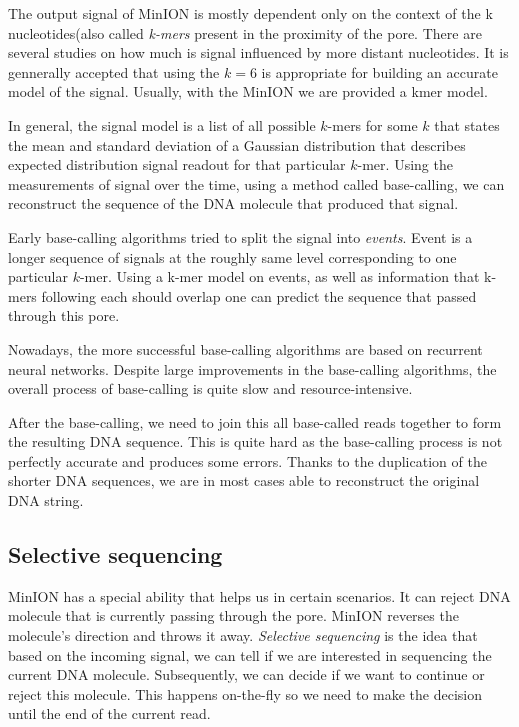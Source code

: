 The output signal of MinION is mostly dependent only on the context of the k
nucleotides(also called \textit{k-mers} present in the proximity of the pore. There are several studies on
how much is signal influenced by more distant nucleotides. It is gennerally accepted
that using the $k = 6$ is appropriate for building an accurate model of the signal. 
Usually, with the MinION we are provided a kmer model.

In general, the signal model is a list of all possible $k$-mers for some $k$
that states the mean and standard deviation of a Gaussian distribution that
describes expected distribution signal readout for that particular $k$-mer.
Using the measurements of signal over the time, using a method called base-calling, we can reconstruct the
sequence of the DNA molecule that produced that signal.

Early base-calling algorithms tried to split the signal into \textit{events}\cite{david2017nanocall}.
Event is a longer sequence of signals at the roughly same level corresponding
to one particular $k$-mer. Using a k-mer model on events, as well as information
that k-mers following each should overlap one can predict the sequence that passed through this pore.

Nowadays, the more successful base-calling algorithms are based on recurrent neural
networks. Despite large improvements in the base-calling algorithms, the overall
process of base-calling is quite slow and resource-intensive. 

After the base-calling, we need to join this all base-called reads together to form the
resulting DNA sequence. This is quite hard as the base-calling process is not perfectly
accurate and produces some errors. Thanks to the duplication of the shorter DNA
sequences, we are in most cases able to reconstruct the original DNA string.

\subsection{Selective sequencing}

MinION has a special ability that helps us in certain scenarios. It can reject
DNA molecule that is currently passing through the pore. MinION reverses the molecule’s direction and throws it away.
\textit{Selective sequencing} is the idea that based on the incoming signal, we can tell
if we are interested in sequencing the current DNA molecule. Subsequently, we can decide if we want
to continue or reject this molecule. This happens on-the-fly so we need to make
the decision until the end of the current read.

